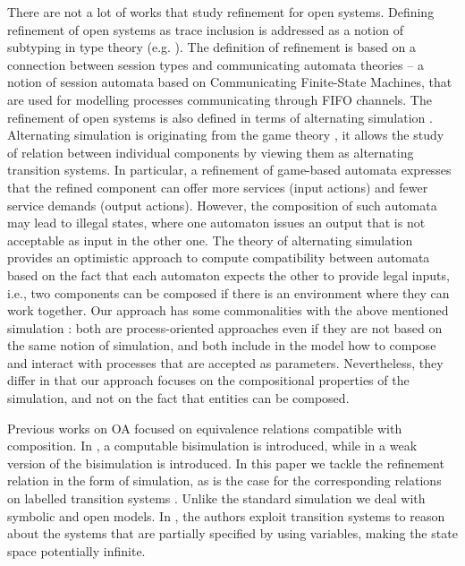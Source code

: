 \documentclass[runningheads]{llncs}
\begin{document}
There are not a lot of works that study refinement for open systems. Defining refinement of open systems as trace inclusion  is  addressed  as a notion of subtyping in type theory 
(e.g. \cite{GayH:2005,BravettiZ:2021}). The definition of refinement is based on a connection  between session types and communicating automata theories -- a notion of session automata
based on Communicating Finite-State Machines, that are used for  modelling processes communicating through FIFO channels.    The refinement of open systems is also defined in terms of  alternating simulation \cite{Alur:1998,deAlfaro:2021}.
Alternating simulation  is originating from the game theory \cite{deAlfaro:2003}, it allows  the study of relation between individual components by viewing them as alternating transition systems. In particular,  a refinement of game-based automata expresses that the refined component can offer more services (input actions) and fewer service demands (output actions). However, the composition of such automata may
lead to illegal states, where one automaton issues an output that is not acceptable as input in the other one. The theory of alternating simulation provides an optimistic approach to compute compatibility between automata based on the fact that each automaton expects the other to provide  legal inputs, i.e., two components can be composed if there is an environment where they can work together. Our approach  has some commonalities with  the above mentioned simulation \cite{deAlfaro:2021}: both are process-oriented approaches even if they are not based on the same notion of simulation, and both include in the model  how to compose and interact with processes that are accepted as parameters.   Nevertheless, they differ in that our approach focuses on the compositional properties of the simulation, and {not on the fact that entities can be composed}.

 
Previous works on OA focused on equivalence relations compatible with composition.
In  \cite{10.1145/3372884.3373161}, a computable bisimulation is introduced, while in \cite{AMHEEMA:2023}  a weak version of the bisimulation is introduced. 
In this paper we tackle the refinement relation in the form of simulation, as is the case for the corresponding relations on labelled transition systems \cite{Bellegarde:2000}. Unlike the standard simulation we deal with symbolic and open models. In \cite{Zhang2014}, the authors exploit transition systems to reason about the systems  that are partially specified by using variables, making  the state space potentially infinite.
\end{document}
